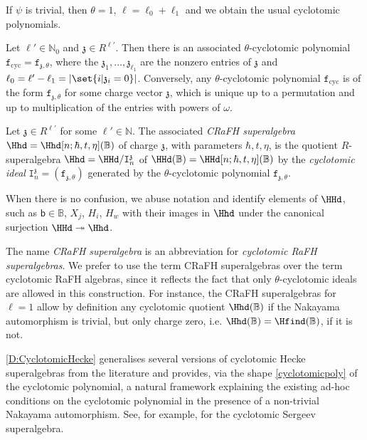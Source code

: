 \documentclass[a4paper,11pt]{amsart}
\numberwithin{equation}{subsection}
\theoremstyle{definition}
\theoremstyle{theorem}
\theoremstyle{remark}
\newcommand\charge{{\mathfrak{z}}}
\newcommand\kapp{{\mathfrak{z}}}
\newcommand\Ic[1][n]{\mathtt{I}^\charge_{#1}}
\newcommand\fct{\mathtt{f}_{\charge,\theta}}
\newcommand\fcyc{\mathtt{f}_{\text{cyc}}}
\newcommand\bb{\mathsf{b}}
\newcommand\RR{R}
\newcommand{\Bo}{\mathbb{B}}
\begin{document}
 \begin{Remark} If $\psi$ is trivial, then $\theta=1$, $\ell=\ell_0+\ell_1$ and we obtain the usual cyclotomic polynomials.
 \end{Remark}

\begin{Remark}\label{ftoc}
  Let $\ell'\in \mathbb{N}_0$ and  $\charge\in\RR^{\ell'}$. Then there is an associated  $\theta$-cyclotomic polynomial $\fcyc=\mathtt{f}_{\charge,\theta}$, where the $\kapp_{1},\ldots, \kapp_{\ell_1}$  are the nonzero entries of $\charge$ and $\ell_0=\ell'-\ell_1=|\set{i|\kapp_i=0}|$.   Conversely, any $\theta$-cyclotomic polynomial $\fcyc$ is of the form $\mathtt{f}_{\charge,\theta}$ for some charge vector $\charge$, which is
  unique up to a permutation and up to multiplication of the entries with powers of $\omega$.
  \end{Remark}

  \begin{Definition}\label{D:CyclotomicHecke}
 Let  $\charge\in\RR^{\ell'}$ for some $\ell'\in\mathbb{N}$. The associated \emph{CRaFH superalgebra}  $\Hhd=\Hhd[n;\hbar, t, \eta](\Bo)$ of charge $\charge$,  with parameters $\hbar,t,\eta$, is the quotient $R$-superalgebra
   $\Hhd=\HHd/\Ic$ of $\HHd(\Bo)=\HHd[n;\hbar, t, \eta](\Bo)$ by the \emph{cyclotomic ideal} $\Ic=(\fct)$ generated by the $\theta$-cyclotomic polynomial $\fct$.
  \end{Definition}

 When there is no confusion, we abuse notation and identify elements of
$\HHd$, such as $\bb\in\Bo$, $X_j$, $H_i$,  $H_w$
with their images in $\Hhd$ under the canonical surjection
$\HHd\twoheadrightarrow\Hhd$.

\begin{Remark}\label{Rk:levelone}
The name \emph{CRaFH superalgebra} is an abbreviation for \emph{cyclotomic RaFH
superalgebras}.  We prefer to use the term CRaFH superalgebras over the term cyclotomic RaFH algebras, since it reflects
the fact that only $\theta$-cyclotomic ideals are allowed in this construction. For instance, the CRaFH superalgebras for $\ell=1$ allow by definition any cyclotomic quotient $\Hhd(\Bo)$ if the Nakayama automorphism is trivial, but only charge zero, i.e. $\Hhd(\Bo)=\Hfind(\Bo)$, if it is not.
\end{Remark}

 \begin{Remark}\label{motcyc}
\autoref{D:CyclotomicHecke} generalises several versions of cyclotomic
Hecke superalgebras from the literature and provides, via the shape
\autoref{cyclotomicpoly}  of the cyclotomic polynomial, a natural
framework explaining the existing ad-hoc conditions on the cyclotomic
polynomial in the presence of a non-trivial Nakayama automorphism. See, for example, \cite[(x3-e)]{BKHeckeClifford} for  the  cyclotomic Sergeev superalgebra.
\end{Remark}
\end{document}
